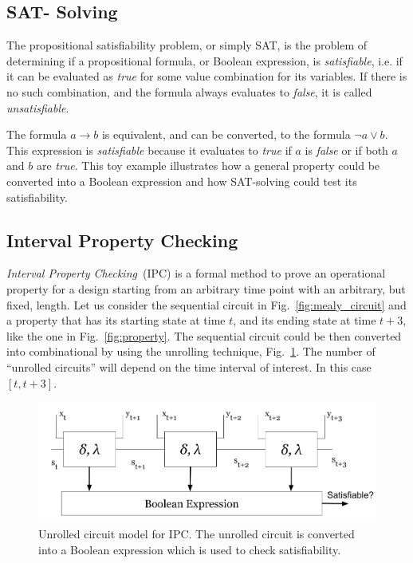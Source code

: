 \subsection*{SAT- Solving}

The propositional satisfiability problem, or simply SAT, is the problem of determining if a propositional formula, or Boolean expression, is \textit{satisfiable}, i.e. if it can be evaluated as \textit{true} for some value combination for its variables. If there is no such combination, and the formula always evaluates to \textit{false}, it is called \textit{unsatisfiable}. 

The formula $a \longrightarrow b$ is equivalent, and can be converted, to the formula $\neg a \lor  b$. This expression is \textit{satisfiable} because it evaluates to \textit{true} if $a$ is \textit{false} or if both $a$ and $b$ are \textit{true}. This toy example illustrates how a general property could be converted into a Boolean expression and how SAT-solving could test its satisfiability.

\subsection{Interval Property Checking}
\label{subsection:ipc}

\textit{Interval Property Checking}~(IPC) is a formal method to prove an operational property for a design starting from an arbitrary time point with an arbitrary, but fixed, length. Let us consider the sequential circuit in Fig.~\ref{fig:mealy_circuit} and a property that has its starting state at time $t$, and its ending state at time $t+3$, like the one in Fig.~\ref{fig:property}. The sequential circuit could be then converted into combinational by using the unrolling technique, Fig.~\ref{fig:unrolled}. The number of “unrolled circuits” will depend on the time interval of interest. In this case $[t, t+3]$.

\begin{figure}[htb!]
	\centering
	\includegraphics[width=\textwidth]{images/unrolled_circuit.png}
	\caption{Unrolled circuit model for IPC. The unrolled circuit is converted into a Boolean expression which is used to check satisfiability.}
	\label{fig:unrolled}
\end{figure}


